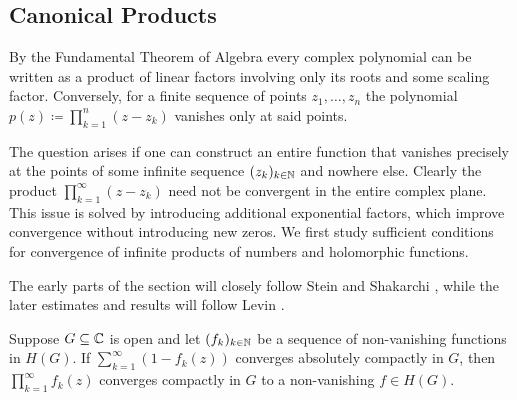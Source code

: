 \subsection{Canonical Products}

By the Fundamental Theorem of Algebra every complex polynomial can be written as a product of linear factors involving only its roots and some scaling factor. Conversely, for a finite sequence of points $z_1, \hdots, z_n$ the polynomial $p(z) \coloneqq \prod_{k=1}^n (z - z_k)$ vanishes only at said points.

The question arises if one can construct an entire function that vanishes precisely at the points of some infinite sequence $(z_k)_{k \in \mathbb{N}}$ and nowhere else. Clearly the product $\prod_{k=1}^\infty (z - z_k)$ need not be convergent in the entire complex plane. This issue is solved by introducing additional exponential factors, which improve convergence without introducing new zeros. We first study sufficient conditions for convergence of infinite products of numbers and holomorphic functions.

The early parts of the section will closely follow Stein and Shakarchi \cite{stein-shakarchi-princeton}, while the later estimates and results will follow Levin \cite{levin-distribution-of-zeros}.

\begin{lemma} \label{lem:infinite-product-criteria}
    Suppose $G \subseteq \mathbb{C}$ is open and let $(f_k)_{k \in \mathbb{N}}$ be a sequence of non-vanishing functions in $H(G)$. If $\sum_{k=1}^\infty (1 - f_k(z))$ converges absolutely compactly in $G$, then $\prod_{k=1}^\infty f_k(z)$ converges compactly in $G$ to a non-vanishing $f \in H(G)$.
\end{lemma}
    
